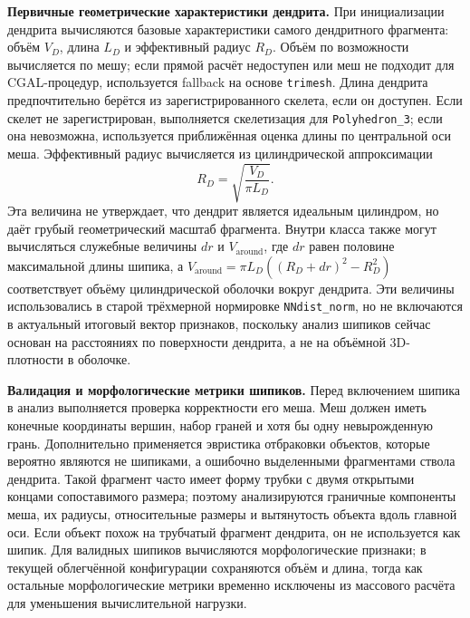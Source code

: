 \documentclass[12pt,a4paper]{article}
\begin{document}
\noindent\textbf{Первичные геометрические характеристики дендрита.}
При инициализации дендрита вычисляются базовые характеристики самого дендритного фрагмента: объём \(V_D\), длина \(L_D\) и эффективный радиус \(R_D\). Объём по возможности вычисляется по мешу; если прямой расчёт недоступен или меш не подходит для CGAL-процедур, используется fallback на основе \texttt{trimesh}. Длина дендрита предпочтительно берётся из зарегистрированного скелета, если он доступен. Если скелет не зарегистрирован, выполняется скелетизация для \texttt{Polyhedron\_3}; если она невозможна, используется приближённая оценка длины по центральной оси меша. Эффективный радиус вычисляется из цилиндрической аппроксимации
\[
R_D=\sqrt{\frac{V_D}{\pi L_D}}.
\]
Эта величина не утверждает, что дендрит является идеальным цилиндром, но даёт грубый геометрический масштаб фрагмента. Внутри класса также могут вычисляться служебные величины \(dr\) и \(V_{\mathrm{around}}\), где \(dr\) равен половине максимальной длины шипика, а \(V_{\mathrm{around}}=\pi L_D((R_D+dr)^2-R_D^2)\) соответствует объёму цилиндрической оболочки вокруг дендрита. Эти величины использовались в старой трёхмерной нормировке \texttt{NNdist\_norm}, но не включаются в актуальный итоговый вектор признаков, поскольку анализ шипиков сейчас основан на расстояниях по поверхности дендрита, а не на объёмной 3D-плотности в оболочке.

\noindent\textbf{Валидация и морфологические метрики шипиков.}
Перед включением шипика в анализ выполняется проверка корректности его меша. Меш должен иметь конечные координаты вершин, набор граней и хотя бы одну невырожденную грань. Дополнительно применяется эвристика отбраковки объектов, которые вероятно являются не шипиками, а ошибочно выделенными фрагментами ствола дендрита. Такой фрагмент часто имеет форму трубки с двумя открытыми концами сопоставимого размера; поэтому анализируются граничные компоненты меша, их радиусы, относительные размеры и вытянутость объекта вдоль главной оси. Если объект похож на трубчатый фрагмент дендрита, он не используется как шипик. Для валидных шипиков вычисляются морфологические признаки; в текущей облегчённой конфигурации сохраняются объём и длина, тогда как остальные морфологические метрики временно исключены из массового расчёта для уменьшения вычислительной нагрузки.
\end{document}

